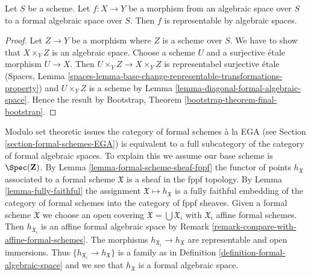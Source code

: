 \begin{lemma}
\label{lemma-space-to-formal-space}
Let $S$ be a scheme. Let $f : X \to Y$ be a morphism from an
algebraic space over $S$ to a formal algebraic space over $S$.
Then $f$ is representable by algebraic spaces.
\end{lemma}

\begin{proof}
Let $Z \to Y$ be a morphism where $Z$ is a scheme over $S$.
We have to show that $X \times_Y Z$ is an algebraic space.
Choose a scheme $U$ and a surjective \'etale morphism $U \to X$.
Then $U \times_Y Z \to X \times_Y Z$ is representabel surjective \'etale
(Spaces, Lemma
\ref{spaces-lemma-base-change-representable-transformations-property})
and $U \times_Y Z$ is a scheme by
Lemma \ref{lemma-diagonal-formal-algebraic-space}.
Hence the result by
Bootstrap, Theorem \ref{bootstrap-theorem-final-bootstrap}.
\end{proof}

\begin{remark}
\label{remark-compare-with-formal-schemes}
Modulo set theoretic issues the category of formal schemes \`a la EGA
(see Section \ref{section-formal-schemes-EGA}) is equivalent to a full
subcategory of the category of formal algebraic spaces. To explain this
we assume our base scheme is $\Spec(\mathbf{Z})$. By
Lemma \ref{lemma-formal-scheme-sheaf-fppf} the functor of points
$h_\mathfrak X$ associated to a formal scheme $\mathfrak X$ is a sheaf
in the fppf topology. By Lemma \ref{lemma-fully-faithful}
the assignment $\mathfrak X \mapsto h_\mathfrak X$ is a fully faithful
embedding of the category of formal schemes into the category of
fppf sheaves. Given a formal scheme $\mathfrak X$ we choose an open covering
$\mathfrak X = \bigcup \mathfrak X_i$ with $\mathfrak X_i$
affine formal schemes. Then $h_{\mathfrak X_i}$
is an affine formal algebraic space by
Remark \ref{remark-compare-with-affine-formal-schemes}.
The morphisms $h_{\mathfrak X_i} \to h_\mathfrak X$ are representable
and open immersions. Thus $\{h_{\mathfrak X_i} \to h_\mathfrak X\}$
is a family as in Definition \ref{definition-formal-algebraic-space}
and we see that $h_\mathfrak X$ is a formal algebraic space.
\end{remark}

